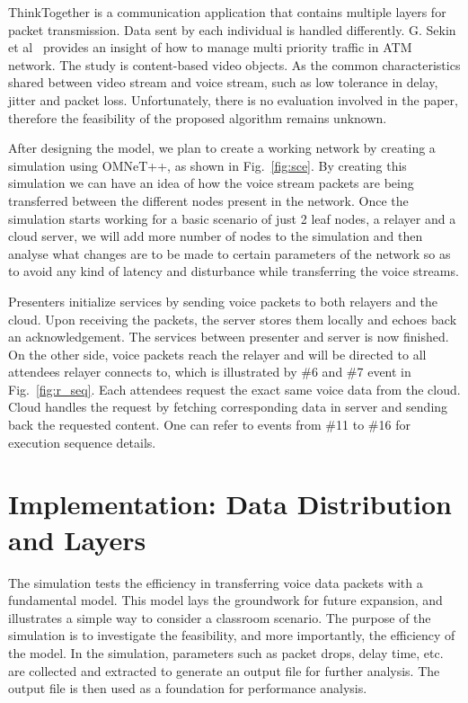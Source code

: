 
ThinkTogether is a communication application that contains multiple layers for
packet transmission. Data sent by each individual is handled differently. G.
Sekin et al~\cite{GF_COM00} provides an insight of how to manage multi
priority traffic in ATM network. The study is content-based video
objects. As the common characteristics shared between video stream and voice
stream, such as low tolerance in delay, jitter and packet loss. Unfortunately, there
is no evaluation involved in the paper, therefore the feasibility of the proposed
algorithm remains unknown.

After designing the model, we plan to create a working
network by creating a simulation using OMNeT++, as shown in Fig.~\ref{fig:sce}.
By creating this simulation we can have an idea of how the voice stream packets
are being transferred between the different nodes present in the network. Once
the simulation starts working for a basic scenario of just 2 leaf nodes, a
relayer and a cloud server, we will add more number of nodes to the simulation
and then analyse what changes are to be made to certain parameters of the
network so as to avoid any kind of latency and disturbance while transferring
the voice streams.

Presenters initialize services by sending voice packets to both relayers and
the cloud. Upon receiving the packets, the server stores them
locally and echoes back an acknowledgement. The services between presenter and
server is now finished. On the other side,
voice packets reach the relayer and will be directed to all attendees relayer
connects to, which is illustrated by \#6 and \#7 event in Fig.~\ref{fig:r_seq}.
Each attendees request the exact same voice data from the cloud.
Cloud handles the request by fetching corresponding data in server and sending
back the requested content. One can refer to events from \#11 to \#16 for
execution sequence details.



\section{Implementation: Data Distribution and Layers}

The simulation tests the efficiency in transferring voice data packets
with a fundamental model. This model lays the groundwork for future expansion,
and illustrates a simple way to consider a classroom scenario. The purpose of
the simulation is to investigate the feasibility, and more importantly, the efficiency of the
model. In the simulation, parameters such as packet drops, delay time, etc. are
collected and extracted to generate an output file for further analysis. The
output file is then used as
a foundation for performance analysis.


